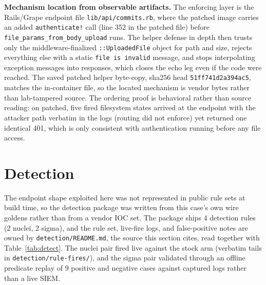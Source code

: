 \documentclass[journal]{IEEEtran}
\begin{document}
\textbf{Mechanism location from observable artifacts.} The enforcing layer is
the Rails/Grape endpoint file \texttt{lib/api/commits.rb}, where the patched
image carries an added \texttt{authenticate!} call (line 352 in the patched
file) before \texttt{file\_params\_from\_body\_upload} runs. The helper defense
in depth then trusts only the middleware-finalized \texttt{::UploadedFile}
object for path and size, rejects everything else with a static \texttt{file
is invalid} message, and stops interpolating exception messages into responses,
which closes the echo leg even if the code were reached. The saved patched
helper byte-copy, sha256 head \texttt{51ff741d2a394ac5}, matches the
in-container file, so the located mechanism is vendor bytes rather than
lab-tampered source. The ordering proof is behavioral rather than source
reading: on patched, five fired filesystem states arrived at the endpoint
with the attacker path verbatim in the logs (routing did not enforce) yet
returned one identical 401, which is only consistent with authentication
running before any file access.

\section{Detection}
\label{sec:detect}

The endpoint shape exploited here was not represented in public rule sets at
build time, so the detection package was written from this case's own wire
goldens rather than from a vendor IOC set. The package ships 4 detection rules
(2 nuclei, 2 sigma), and the rule set, live-fire logs, and false-positive
notes are owned by \texttt{detection/README.md}, the source this section
cites, read together with Table~\ref{tab:detect}.
The nuclei pair fired live against the stock arm (verbatim tails in
\texttt{detection/rule-fires/}), and the sigma pair validated through an
offline predicate replay of 9 positive and negative cases against captured
logs rather than a live SIEM.
\end{document}
